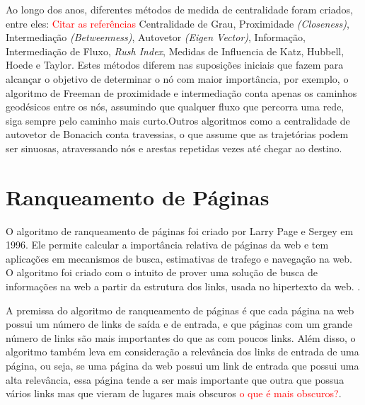 
Ao longo dos anos, diferentes métodos de medida de centralidade foram criados, entre eles: \textcolor{red}{Citar as referências}
Centralidade de Grau, Proximidade \textit{(Closeness)}, Intermediação \textit{(Betweenness)}, Autovetor \textit{(Eigen Vector)}, Informação, Intermediação de Fluxo, \textit{Rush Index}, Medidas de Influencia de Katz, Hubbell, Hoede e Taylor. Estes métodos diferem nas suposições
iniciais que fazem para alcançar o objetivo de determinar o nó com maior importância, por exemplo, o algoritmo de Freeman de proximidade e intermediação conta apenas os caminhos geodésicos entre os nós, assumindo que qualquer fluxo que percorra uma rede, siga sempre pelo caminho mais curto.Outros algoritmos como a centralidade de autovetor de Bonacich conta travessias, o que assume que as trajetórias podem ser sinuosas, atravessando nós e arestas repetidas vezes até chegar ao destino\cite{centrality}.


\section{Ranqueamento de Páginas}
\label{ref:ran}
O algoritmo de ranqueamento de páginas foi criado por Larry Page e Sergey em 1996. Ele permite calcular a importância relativa de páginas da web e tem aplicações em mecanismos de busca, estimativas de trafego e navegação na web. O algoritmo foi criado com o intuito de prover uma solução de busca de informações na web a partir da estrutura dos links, usada no hipertexto da web. \cite{pageRank}.

A premissa do algoritmo de ranqueamento de páginas é que cada página na web possui um número de links de saída e de entrada, e que páginas com um grande número de links são mais importantes do que as com poucos links. Além disso, o algoritmo também leva em consideração a relevância dos links de entrada de uma página, ou seja, se uma página da web possui um link de entrada que possui uma alta relevância, essa página tende a ser mais importante que outra que possua vários links mas que vieram de lugares mais obscuros \textcolor{red}{o que é mais obscuros?}.

